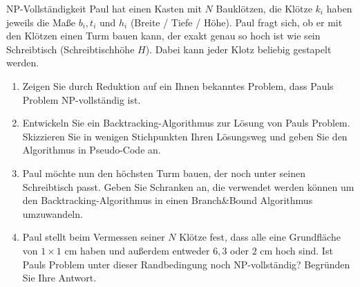 \documentclass{article}
\begin{document}
\begin{exercise}{NP-Vollständigkeit}
  Paul hat einen Kasten mit $N$ Bauklötzen, die Klötze $k_i$ haben jeweils die Maße $b_i, t_i$ und $h_i$ (Breite / Tiefe / Höhe). Paul fragt sich, ob er mit den Klötzen einen Turm bauen kann, der exakt genau so hoch ist wie sein Schreibtisch (Schreibtischhöhe $H$). Dabei kann jeder Klotz beliebig gestapelt werden.
  \begin{enumerate}
    \item Zeigen Sie durch Reduktion auf ein Ihnen bekanntes Problem, dass Pauls Problem NP-vollständig ist.
    \item Entwickeln Sie ein Backtracking-Algorithmus zur Lösung von Pauls Problem. Skizzieren Sie in wenigen Stichpunkten Ihren Lösungsweg und geben Sie den Algorithmus in Pseudo-Code an.
    \item Paul möchte nun den höchsten Turm bauen, der noch unter seinen Schreibtisch passt. Geben Sie Schranken an, die verwendet werden können um den Backtracking-Algorithmus in einen Branch\&Bound Algorithmus umzuwandeln.
    \item Paul stellt beim Vermessen seiner $N$ Klötze fest, dass alle eine Grundfläche von $1 \times 1$ cm haben und außerdem entweder $6, 3$ oder $2$ cm hoch sind. Ist Pauls Problem unter dieser Randbedingung noch NP-vollständig? Begründen Sie Ihre Antwort.
  \end{enumerate}


\end{exercise}
\end{document}
